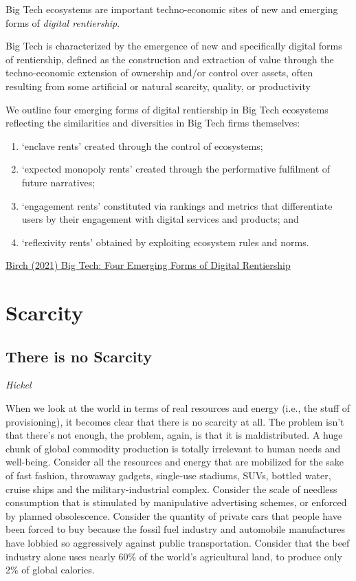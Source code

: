 \documentclass[
]{book}
\begin{document}
Big Tech ecosystems are important techno-economic sites of new and
emerging forms of \emph{digital rentiership}.

Big Tech is characterized by the emergence of new and specifically digital forms of rentiership, defined as the construction and extraction of value through the techno-economic extension of ownership and/or control over assets, often resulting from some artificial or natural scarcity, quality, or productivity

We outline four emerging forms of digital rentiership in Big Tech ecosystems reflecting the similarities and diversities in Big Tech firms themselves:

\begin{enumerate}
\def\labelenumi{(\arabic{enumi})}
\item
  `enclave rents' created through the control of ecosystems;
\item
  `expected monopoly rents' created through the performative fulfilment of future narratives;
\item
  `engagement rents' constituted via rankings and metrics that differentiate users by their engagement with digital services and products; and
\item
  `reflexivity rents' obtained by exploiting ecosystem rules and norms.
\end{enumerate}

\href{https://www.tandfonline.com/doi/full/10.1080/09505431.2021.1932794}{Birch (2021) Big Tech: Four Emerging Forms of Digital Rentiership}

\hypertarget{scarcity}{%
\chapter{Scarcity}\label{scarcity}}

\hypertarget{there-is-no-scarcity}{%
\section{There is no Scarcity}\label{there-is-no-scarcity}}

\emph{Hickel}

When we look at the world in terms of real resources and energy (i.e., the stuff of provisioning), it becomes clear that there is no scarcity at all. The problem isn't that there's not enough, the problem, again, is that it is maldistributed. A huge chunk of global commodity production is totally irrelevant to human needs and well-being. Consider all the resources and energy that are mobilized for the sake of fast fashion, throwaway gadgets, single-use stadiums, SUVs, bottled water, cruise ships and the military-industrial complex. Consider the scale of needless consumption that is stimulated by manipulative advertising schemes, or enforced by planned obsolescence. Consider the quantity of private cars that people have been forced to buy because the fossil fuel industry and automobile manufactures have lobbied so aggressively against public transportation. Consider that the beef industry alone uses nearly 60\% of the world's agricultural land, to produce only 2\% of global calories.
\end{document}
